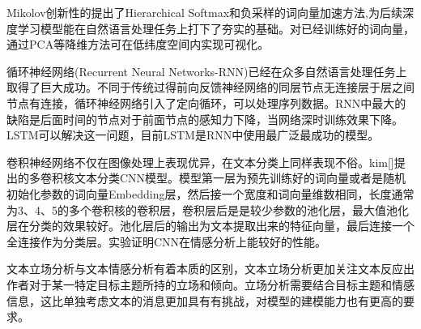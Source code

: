 Mikolov创新性的提出了Hierarchical Softmax和负采样的词向量加速方法,为后续深度学习模型能在自然语言处理任务上打下了夯实的基础。对已经训练好的词向量，通过PCA等降维方法可在低纬度空间内实现可视化。

循环神经网络(Recurrent Neural Networks-RNN)已经在众多自然语言处理任务上取得了巨大成功。不同于传统过得前向反馈神经网络的同层节点无连接层于层之间节点有连接，循环神经网络引入了定向循环，可以处理序列数据。RNN中最大的缺陷是后面时间的节点对于前面节点的感知力下降，当网络深时训练效果下降。LSTM可以解决这一问题，目前LSTM是RNN中使用最广泛最成功的模型。

卷积神经网络不仅在图像处理上表现优异，在文本分类上同样表现不俗。kim[]提出的多卷积核文本分类CNN模型。模型第一层为预先训练好的词向量或者是随机初始化参数的词向量Embedding层，然后接一个宽度和词向量维数相同，长度通常为3、4、5的多个卷积核的卷积层，卷积层后是是较少参数的池化层，最大值池化层在分类的效果较好。池化层后的输出为文本提取出来的特征向量，最后连接一个全连接作为分类层。实验证明CNN在情感分析上能较好的性能。

文本立场分析与文本情感分析有着本质的区别，文本立场分析更加关注文本反应出作者对于某一特定目标主题所持的立场和倾向。立场分析需要结合目标主题和情感信息，这比单独考虑文本的消息更加具有有挑战，对模型的建模能力也有更高的要求。